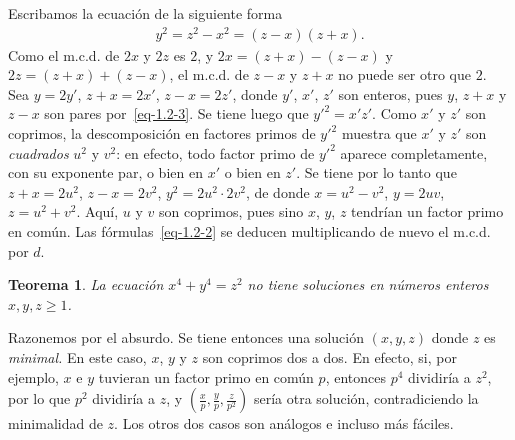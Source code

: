 \documentclass[bibtotoc,leqno,spanish]{amsbook}
\numberwithin{equation}{section}
\theoremstyle{note}
\theoremstyle{note}
\newtheorem{theorem}{Teorema}
\theoremstyle{rem}
\numberwithin{theorem}{section}
\numberwithin{proposition}{section}
\numberwithin{definition}{section}
\numberwithin{lemma}{section}
\numberwithin{corollary}{section}
\numberwithin{example}{section}
\numberwithin{footnote}{section}%
\begin{document}
Escribamos la ecuaci\'on de la siguiente forma
\begin{gather}\label{eq-1.2-4}
y^{2} = z^{2}-x^{2} = (z-x)(z+x).
\end{gather}
Como el m.c.d. de $2x$ y $2z$ es $2$, y $2x = (z+x)-(z-x)$ y $2z = (z+x)+(z-x)$, el
m.c.d. de $z-x$ y $z+x$ no puede ser otro que $2$. Sea $y = 2y'$, $z+x = 2x'$,
$z-x = 2z'$, donde $y'$, $x'$, $z'$ son enteros, pues $y$, $z+x$ y $z-x$ son pares
por~\eqref{eq-1.2-3}. Se tiene luego que $y'^{2} = x'z'$. Como $x'$ y $z'$ son coprimos, la descomposici\'on
en factores primos de $y'^{2}$ muestra que $x'$ y $z'$ son {\em cuadrados} $u^{2}$ y $v^{2}$:
en efecto, todo factor primo de $y'^{2}$ aparece completamente, con su exponente par,
o bien en $x'$ o bien en $z'$. Se tiene por lo tanto que $z+x = 2u^{2}$, $z-x = 2v^{2}$,
$y^{2} = 2u^{2}\cdot 2v^{2}$, de donde $x = u^{2}-v^{2}$, $y=2uv$, $z=u^{2}+v^{2}$. Aqu\'i,
$u$ y $v$ son coprimos, pues sino $x$, $y$, $z$ tendr\'ian un factor primo en com\'un. Las
f\'ormulas~\eqref{eq-1.2-2} se deducen multiplicando de nuevo el m.c.d. por $d$.

\begin{theorem}\label{teo2.2.2}
La ecuaci\'on $x^{4}+y^{4}=z^{2}$ no tiene soluciones en n\'umeros enteros $x, y, z \geq 1$.
\end{theorem}

Razonemos por el absurdo. Se tiene entonces una soluci\'on $(x,y,z)$ donde $z$ es {\em minimal.}
En este caso, $x$, $y$ y $z$ son coprimos dos a dos. En efecto, si, por ejemplo, $x$ e $y$ tuvieran
un factor primo en com\'un $p$, entonces $p^{4}$ dividir\'ia a $z^{2}$, por lo que $p^{2}$ dividir\'ia
a $z$, y $\left(\frac{x}{p},\frac{y}{p},\frac{z}{p^{2}}\right)$ ser\'ia otra soluci\'on, contradiciendo
la minimalidad de $z$. Los otros dos casos son an\'alogos e incluso m\'as f\'aciles.
\end{document}
